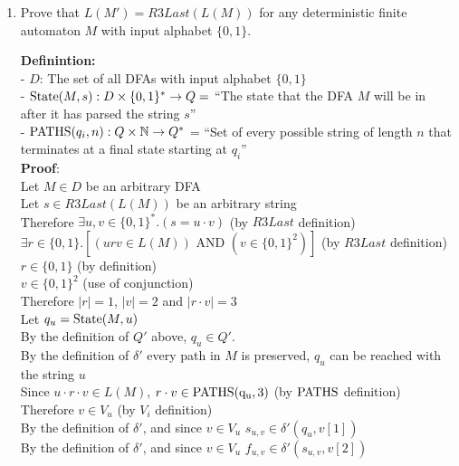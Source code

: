 \documentclass[11pt]{article}
\def\nats {{\mathbb N}}
\newcommand{\And}{\mbox{ AND }}
\begin{document}
\begin{enumerate}
\begin{solution}
\end{solution}

\item
\begin{question}
Prove that $L(M') = R3Last(L(M))$ for any deterministic finite automaton $M$ with input alphabet $\{0,1\}$.
\end{question}

\begin{solution}
{\bf Definintion:}\\
- $D$: The set of all DFAs with input alphabet $\{0,1\}$ \\
- ${\rm State}(M, s): D\times \{0,1\}^* \rightarrow Q = $ ``The state that the DFA $M$ will be in after it has parsed the string $s$'' \\
- ${\rm PATHS}(q_i, n): Q\times\nats\rightarrow Q^* $ = ``Set of every possible string of length $n$ that terminates at a final state starting at $q_i$''\\
{\bf Proof}:\\
\null\quad Let $M\in D$ be an arbitrary DFA\\
\null\qquad Let $s\in R3Last(L(M))$ be an arbitrary string\\
\null\qquad Therefore $\exists u,v\in \{0,1\}^*.(s = u\cdot v)$ (by $R3Last$ definition)\\
\null\qquad $\exists r\in\{0,1\}.[(urv\in L(M))\And (v\in\{0,1\}^2)]$ (by $R3Last$ definition)\\
\null\qquad $r\in\{0,1\}$ (by definition)\\
\null\qquad $v\in\{0,1\}^2$ (use of conjunction)\\
\null\qquad Therefore $|r| = 1$, $|v| = 2$ and $|r\cdot v| = 3$\\
\null\qquad Let $q_u = {\rm State}(M, u)$\\
\null\qquad By the definition of $Q'$ above, $q_u\in Q'$.\\
\null\qquad By the definition of $\delta'$ every path in $M$ is preserved, $q_u$ can be reached with the string $u$\\
\null\qquad Since $u\cdot r\cdot v \in L(M)$, $r\cdot v \in \rm PATHS(q_u,3)$ (by ${\rm PATHS}$ definition)\\
\null\qquad Therefore $v \in V_u$ (by $V_i$ definition)\\
\null\qquad By the definition of $\delta'$, and since $v\in V_u$ $s_{u, v} \in \delta'(q_u, v[1])$\\
\null\qquad By the definition of $\delta'$, and since $v\in V_u$ $f_{u,v} \in\delta' (s_{u,v}, v[2])$\\

\end{solution}
\end{enumerate}
\end{document}
